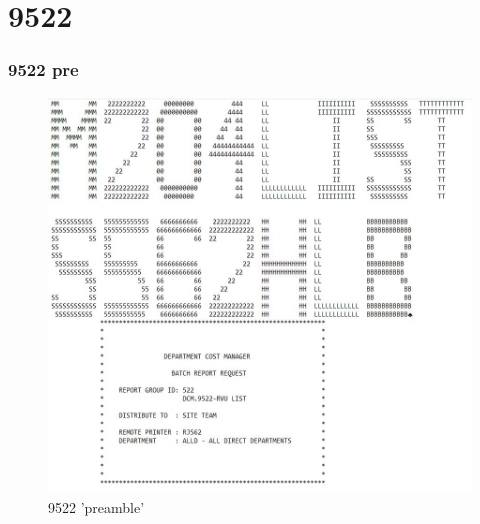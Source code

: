 \documentclass{beamer}\usepackage[]{graphicx}\usepackage[]{color}
\begin{document}
\section{9522}
\begin{frame}[fragile]
  \frametitle{9522 pre}
  
\begin{figure}
\includegraphics[scale=0.4]{9522_preamble}
\caption{9522 'preamble'}
\end{figure}
  
\end{frame}
\end{document}
